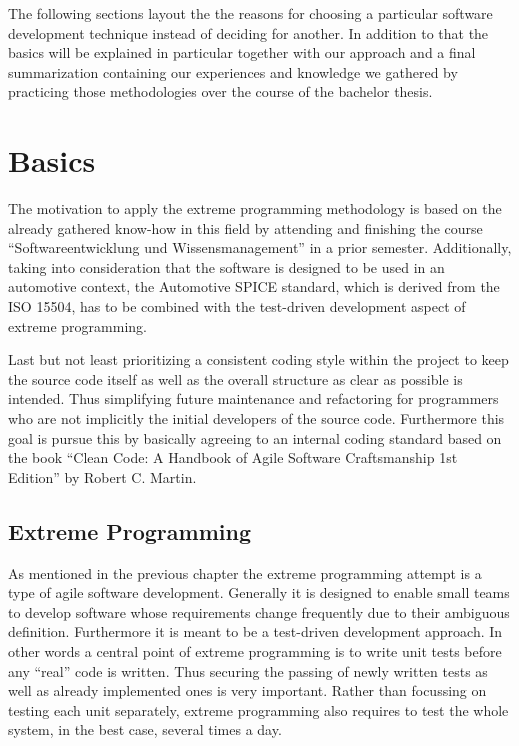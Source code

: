 The following sections layout the the reasons for choosing a particular software development technique instead of deciding 
for another. In addition to that the basics will be explained in particular together with our approach and a final summarization 
containing our experiences and knowledge we gathered by practicing those methodologies over the course of the bachelor thesis.

\section{Basics}

The motivation to apply the extreme programming methodology is based on the already gathered know-how in this field by attending 
and finishing the course “Softwareentwicklung und Wissensmanagement” in a prior semester. Additionally, taking into consideration 
that the software is designed to be used in an automotive context, the Automotive SPICE standard, which is derived from the ISO 15504, 
has to be combined with the test-driven development aspect of extreme programming.

Last but not least prioritizing a consistent coding style within the project to keep the source code itself as well as the overall 
structure as clear as possible is intended. Thus simplifying future maintenance and refactoring for programmers who are not implicitly 
the initial developers of the source code. Furthermore this goal is pursue this by basically agreeing to an internal coding standard 
based on the book “Clean Code: A Handbook of Agile Software Craftsmanship 1st Edition” by Robert C. Martin.

\subsection{Extreme Programming}

As mentioned in the previous chapter the extreme programming attempt is a type of agile software development. Generally it is designed 
to enable small teams to develop software whose requirements change frequently due to their ambiguous definition. Furthermore it is meant 
to be a test-driven development approach. In other words a central point of extreme programming is to write unit tests before any “real” 
code is written. Thus securing the passing of newly written tests as well as already implemented ones is very important. Rather than 
focussing on testing each unit separately, extreme programming also requires to test the whole system, in the best case, several times a day.

